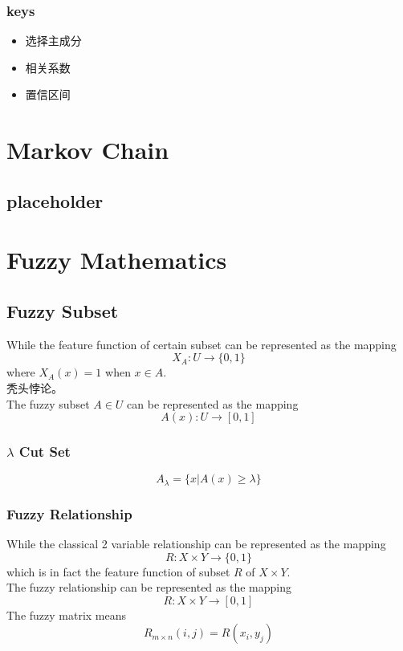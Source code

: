 \documentclass[12pt,a4paper]{article} \usepackage{kurier}
\begin{document}
\begin{CJK}{UTF8}{gkai}
\begin{multicols}{2}
		\subsubsection{keys}
			\begin{itemize}
			\item 选择主成分
			\item 相关系数
			\item 置信区间
			\end{itemize}
\end{multicols}
	
\section{Markov Chain}
\begin{multicols}{2}
	\subsection{placeholder}
\end{multicols}

\section{Fuzzy Mathematics}
\begin{multicols}{2}
	\subsection{Fuzzy Subset}
		While the feature function of certain subset can be represented as the mapping
		\[ X_A : U \to \{0,1\} \]
		where $ X_A (x) = 1 $ when $ x \in A $.\\
		秃头悖论。\\
		The fuzzy subset $A \in U$ can be represented as the mapping
		\[ A(x): U \to [0,1] \]
		\subsubsection{$\lambda$ Cut Set}
			\[ A_\lambda = \{ x | A(x) \geqslant \lambda \} \]
		\subsubsection{Fuzzy Relationship}
			While the classical 2 variable relationship can be represented as the mapping
			\[ R : X \times Y \to \{ 0, 1 \} \]
			which is in fact the feature function of subset $R$ of $X \times Y$.\\
			The fuzzy relationship can be represented as the mapping
			\[ R : X \times Y \to [ 0, 1 ] \]
			The fuzzy matrix means \[ R_{m\times n}(i,j) = R(x_i,y_j) \]

\end{multicols}
\end{CJK}
\end{document}
